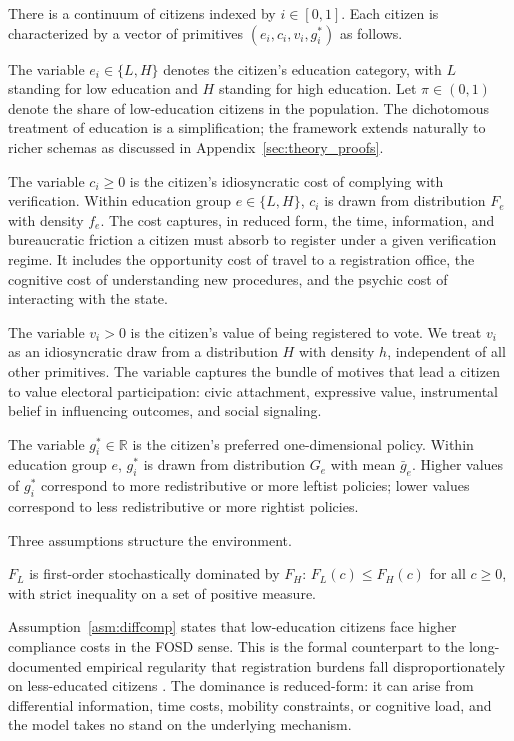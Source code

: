 There is a continuum of citizens indexed by $i \in [0, 1]$. Each citizen is characterized by a vector of primitives $(e_i, c_i, v_i, g_i^*)$ as follows.

The variable $e_i \in \{L, H\}$ denotes the citizen's education category, with $L$ standing for low education and $H$ standing for high education. Let $\pi \in (0, 1)$ denote the share of low-education citizens in the population. The dichotomous treatment of education is a simplification; the framework extends naturally to richer schemas as discussed in Appendix~\ref{sec:theory_proofs}.

The variable $c_i \geq 0$ is the citizen's idiosyncratic cost of complying with verification. Within education group $e \in \{L, H\}$, $c_i$ is drawn from distribution $F_e$ with density $f_e$. The cost captures, in reduced form, the time, information, and bureaucratic friction a citizen must absorb to register under a given verification regime. It includes the opportunity cost of travel to a registration office, the cognitive cost of understanding new procedures, and the psychic cost of interacting with the state.

The variable $v_i > 0$ is the citizen's value of being registered to vote. We treat $v_i$ as an idiosyncratic draw from a distribution $H$ with density $h$, independent of all other primitives. The variable captures the bundle of motives that lead a citizen to value electoral participation: civic attachment, expressive value, instrumental belief in influencing outcomes, and social signaling.

The variable $g_i^* \in \mathbb{R}$ is the citizen's preferred one-dimensional policy. Within education group $e$, $g_i^*$ is drawn from distribution $G_e$ with mean $\bar g_e$. Higher values of $g_i^*$ correspond to more redistributive or more leftist policies; lower values correspond to less redistributive or more rightist policies.

Three assumptions structure the environment.

\begin{assumption}
\label{asm:diffcomp}
$F_L$ is first-order stochastically dominated by $F_H$: $F_L(c) \leq F_H(c)$ for all $c \geq 0$, with strict inequality on a set of positive measure.
\end{assumption}

Assumption~\ref{asm:diffcomp} states that low-education citizens face higher compliance costs in the FOSD sense. This is the formal counterpart to the long-documented empirical regularity that registration burdens fall disproportionately on less-educated citizens \citep{Rosenstone1978, Nagler1991, Ansolabehere2006, Hajnal2017}. The dominance is reduced-form: it can arise from differential information, time costs, mobility constraints, or cognitive load, and the model takes no stand on the underlying mechanism.

